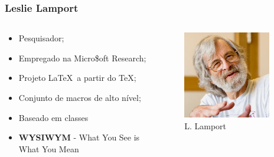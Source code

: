 \documentclass[14pt]{beamer}
\begin{document}
\begin{frame}
  \frametitle{Leslie Lamport}
  \begin{columns}
      \begin{column}{0.7\textwidth}
        \begin{itemize}
          \item <2-> Pesquisador;
          \item <3-> Empregado na Micro\$oft Research;
          \item <4-> Projeto \LaTeX~a partir do \TeX;
          \item <5-> Conjunto de macros de alto nível;
          \item <6-> Baseado em classes
          \item <7-> \textbf{WYSIWYM} - \small{What You See is What You Mean}           
        \end{itemize}
      \end{column}
      \begin{column}{0.3\textwidth}
        \begin{figure}
          \includegraphics[width=0.9\textwidth]{img/l-lamport.jpg}
          \caption{L. Lamport}
        \end{figure}
      \end{column}
  \end{columns}

\end{frame}
\end{document}
